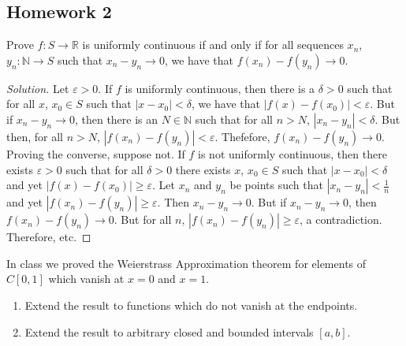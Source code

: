 \documentclass[crop=false,class=article,oneside]{standalone}
\begin{document}
    \subsection{Homework 2}
        \begin{problem}
            Prove $f:S\rightarrow\mathbb{R}$ is uniformly
            continuous if and only if for all sequences
            $x_{n}$, $y_{n}:\mathbb{N}\rightarrow{S}$
            such that $x_{n}-y_{n}\rightarrow{0}$, we have that
            $f(x_{n})-f(y_{n})\rightarrow{0}$.
        \end{problem}
        \begin{proof}[Solution]
            Let $\varepsilon>0$. If $f$ is uniformly continuous,
            then there is a $\delta>0$ such that for all
            $x$, $x_{0}\in{S}$ such that $|x-x_{0}|<\delta$,
            we have that $|f(x)-f(x_{0})|<\varepsilon$. But if
            $x_{n}-y_{n}\rightarrow{0}$, then there is an
            $N\in\mathbb{N}$ such that for all $n>N$,
            $|x_{n}-y_{n}|<\delta$. But then, for all $n>N$,
            $|f(x_{n})-f(y_{n})|<\varepsilon$. Thefefore,
            $f(x_{n})-f(y_{n})\rightarrow{0}$. Proving the
            converse, suppose not. If $f$ is not uniformly
            continuous, then there exists $\varepsilon>0$
            such that for all $\delta>0$ there exists
            $x$, $x_{0}\in{S}$ such that
            $|x-x_{0}|<\delta$ and yet
            $|f(x)-f(x_{0})|\geq{\varepsilon}$. Let
            $x_{n}$ and $y_{n}$ be points such that
            $|x_{n}-y_{n}|<\frac{1}{n}$ and yet
            $|f(x_{n})-f(y_{n})|\geq\varepsilon$. Then
            $x_{n}-y_{n}\rightarrow{0}$. But if
            $x_{n}-y_{n}\rightarrow{0}$, then
            $f(x_{n})-f(y_{n})\rightarrow{0}$. But for all
            $n$, $|f(x_{n})-f(y_{n})|\geq{\varepsilon}$,
            a contradiction. Therefore, etc.
        \end{proof}
        \begin{problem}
            In class we proved the Weierstrass Approximation
            theorem for elements of $C[0,1]$ which vanish
            at $x=0$ and $x=1$.
            \begin{enumerate}
                \item Extend the result to functions which
                      do not vanish at the endpoints.
                \item Extend the result to arbitrary
                      closed and bounded intervals $[a,b]$.
            \end{enumerate}
        \end{problem}
\end{document}
